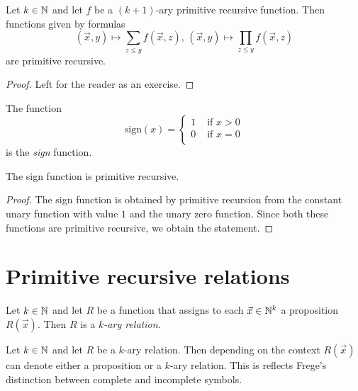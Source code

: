 \documentclass[10pt]{amsart}
\begin{document}
\begin{corollary}\label{corollary:fold_mechanism_for_sum_and_product_is_primitive_recursive}
	Let $k\in {\mathbb N}$ and let $f$ be a $(k + 1)$-ary primitive recursive function. Then functions given by formulas
	$$(\vec{x},y)\mapsto \sum_{z \leq y}f(\vec{x},z),\,(\vec{x},y) \mapsto \prod_{z \leq y}f(\vec{x},z)$$
	are primitive recursive.
\end{corollary}
\begin{proof}
	Left for the reader as an exercise.
\end{proof}

\begin{definition}
	The function
	$$\mathrm{sign}(x) = \begin{cases}
			1 & \mbox{ if }x > 0 \\
			0 & \mbox{ if }x = 0 \\
		\end{cases}$$
	is the \textit{sign} function.
\end{definition}

\begin{proposition}\label{proposition:zero_indicator_is_primitive_recursive}
	The sign function is primitive recursive.
\end{proposition}
\begin{proof}
	The sign function is obtained by primitive recursion from the constant unary function with value $1$ and the unary zero function. Since both these functions are primitive recursive, we obtain the statement.
\end{proof}

\section{Primitive recursive relations}

\begin{definition}
	Let $k\in {\mathbb N}$ and let $R$ be a function that assigns to each $\vec{x} \in {\mathbb N}^k$ a proposition $R(\vec{x})$. Then $R$ is a \textit{$k$-ary relation}.
\end{definition}

\begin{remark}\label{remark:relation_can_be_identified_with_formula}
	Let $k\in {\mathbb N}$ and let $R$ be a $k$-ary relation. Then depending on the context $R(\vec{x})$ can denote either a proposition or a $k$-ary relation. This is reflects Frege's distinction between complete and incomplete symbols.
\end{remark}
\end{document}
